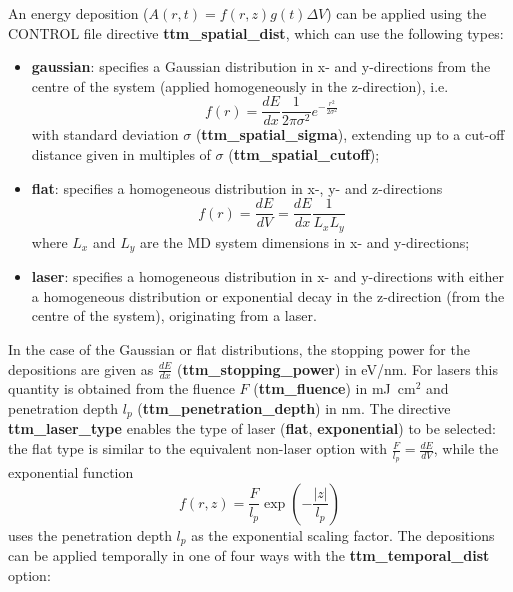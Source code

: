 An energy deposition
($A(r,t) = f(r,z) g(t) \Delta V$) can be applied using the CONTROL file 
directive {\bf ttm\_spatial\_dist}, which can use the following types:
\begin{itemize}
\item {\bf gaussian}: specifies a Gaussian distribution in x- and y-directions from the centre of the system (applied homogeneously in the z-direction), i.e.\begin{equation*}f(r) = \frac{dE}{dx} \frac{1}{2 \pi \sigma^2} e^{-\frac{r^2}{2\sigma^2}}\end{equation*} with standard deviation $\sigma$ ({\bf ttm\_spatial\_sigma}), extending up to a cut-off distance given in multiples of $\sigma$ ({\bf ttm\_spatial\_cutoff});
\item {\bf flat}: specifies a homogeneous distribution in x-, y- and z-directions \begin{equation*}f(r) = \frac{dE}{dV} = \frac{dE}{dx} \frac{1}{L_{x} L_{y}}\end{equation*} where $L_{x}$ and $L_{y}$ are the MD system dimensions in x- and y-directions;
\item {\bf laser}: specifies a homogeneous distribution in x- and y-directions with either a homogeneous distribution or exponential decay in the z-direction (from the centre of the system), originating from a laser.
\end{itemize}
In the case of the Gaussian or flat distributions, the stopping power for 
the depositions are given as $\frac{dE}{dx}$ ({\bf ttm\_stopping\_power}) 
in eV/nm. For lasers this quantity is obtained from the fluence $F$ 
({\bf ttm\_fluence}) in mJ~cm$^2$ and penetration depth $l_p$
({\bf ttm\_penetration\_depth}) in nm. The directive {\bf ttm\_laser\_type} 
enables the type of laser ({\bf flat}, {\bf exponential}) to be selected: the flat
type is similar to the equivalent non-laser option with $\frac{F}{l_p} = \frac{dE}{dV}$,
while the exponential function \begin{equation*}f(r,z) = \frac{F}{l_p} \exp\left(-\frac{|z|}{l_p}\right) \end{equation*} 
uses the penetration depth $l_p$ as the exponential scaling factor.
The depositions can be applied temporally in one of four ways
with the {\bf ttm\_temporal\_dist} option:
